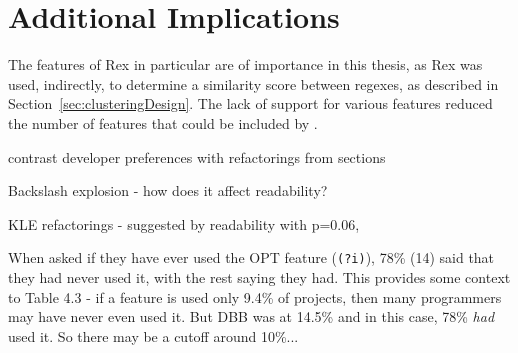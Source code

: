 \section{Additional Implications}

The features of Rex in particular are of importance in this thesis, as Rex was used, indirectly, to determine a similarity score between regexes, as described in Section~\ref{sec:clusteringDesign}.  The lack of support for various features reduced the number of features that could be included by .

contrast developer preferences with refactorings from sections

Backslash explosion - how does it affect readability?

KLE refactorings - suggested by readability with p=0.06,






When asked if they have ever used the OPT feature (\verb!(?i)!), 78\% (14) said that they had never used it, with the rest saying they had.  This provides some context to Table 4.3 - if a feature is used only 9.4\% of projects, then many programmers may have never even used it.  But DBB was at 14.5\% and in this case, 78\% \emph{had} used it.  So there may be a cutoff around 10\%...



% 

